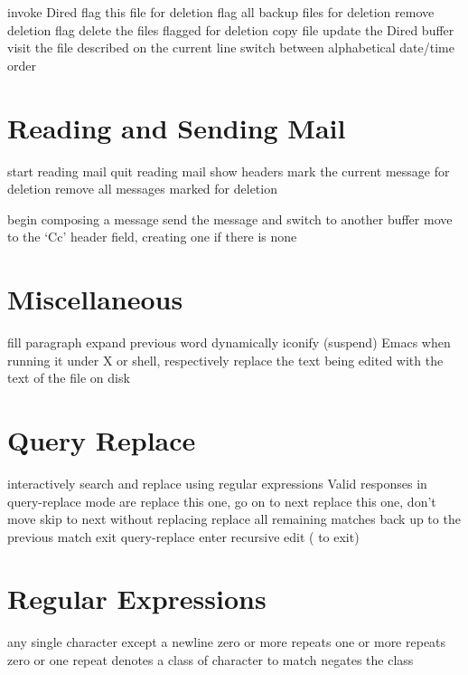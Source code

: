  invoke Dired
 flag this file for deletion
\key{\~{}} flag all backup files for deletion
 remove deletion flag
 delete the files flagged for deletion
 copy file
 update the Dired buffer
 visit the file described on the current line
 switch between alphabetical date/time order

\section{Reading and Sending Mail}

 start reading mail
 quit reading mail
 show headers
 mark the current message for deletion
 remove all messages marked for deletion

 begin composing a message
 send the message and switch to another buffer
 move to the `Cc' header field, creating one
  if there is none

\section{Miscellaneous}

 fill paragraph
 expand previous word dynamically
 iconify (suspend) Emacs when running it under X or
  shell, respectively
 replace the text being edited with the
  text of the file on disk

\section{Query Replace}

 interactively search and replace
 using regular expressions
\askip
Valid responses in query-replace mode are
\askip
{} replace this one, go on to next
\key{,} replace this one, don't move
 skip to next without replacing
\key{!} replace all remaining matches
\key{\^{}} back up to the previous match
 exit query-replace
 enter recursive edit ( to exit)

\section{Regular Expressions}

 any single character except a newline
\key{*} zero or more repeats
\key{+} one or more repeats
 zero or one repeat
\key{[$\ldots$]} denotes a class of character to match
\key{[\^{}$\ldots$]} negates the class

